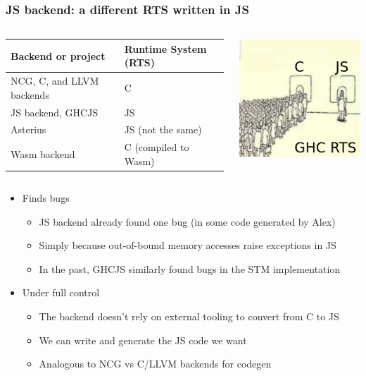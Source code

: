 \documentclass{beamer}
\begin{document}
\begin{frame}
\frametitle{JS backend: a different RTS written in JS}

\begin{columns}

\begin{column}{0.7\textwidth}
\resizebox{8cm}{!}
{
\begin{tabular}{ll}
\hline
\textbf{Backend or project} & \textbf{Runtime System (RTS)} \\ \hline
NCG, C, and LLVM backends & C \\
JS backend, GHCJS         & JS \\
Asterius                  & JS (not the same) \\
Wasm backend & C (compiled to Wasm) \\ \hline
\end{tabular}
}
\end{column}

\begin{column}{0.2\textwidth}
\includegraphics[scale=0.3]{images/queue_rts.png}
\end{column}
\end{columns}

\vspace{1cm}

\begin{itemize}
\item Finds bugs
\begin{itemize}
\item JS backend already found one bug (in some code generated by Alex)
\item Simply because out-of-bound memory accesses raise exceptions in JS
\item In the past, GHCJS similarly found bugs in the STM implementation
\end{itemize}
\item Under full control
\begin{itemize}
\item The backend doesn’t rely on external tooling to convert from C to JS
\item We can write and generate the JS code we want
\item Analogous to NCG vs C/LLVM backends for codegen
\end{itemize}
\end{itemize}
\end{frame}
\end{document}
